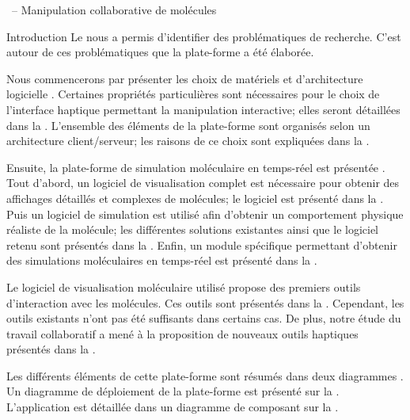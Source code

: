 \documentclass[myfrancais]{mythesis}
\begin{document}
	\begin{mychapter}{\myShaddock\ -- Manipulation collaborative de molécules}
		\begin{mysection}{Introduction}
			Le  nous a permis d'identifier des problématiques de recherche.
			C'est autour de ces problématiques que la plate-forme \myShaddock a été élaborée.

			Nous commencerons par présenter les choix de matériels et d'architecture logicielle .
			Certaines propriétés particulières sont nécessaires pour le choix de l'interface haptique permettant la manipulation interactive; elles seront détaillées dans la .
			L'ensemble des éléments de la plate-forme sont organisés selon un architecture client/serveur; les raisons de ce choix sont expliquées dans la .

			Ensuite, la plate-forme de simulation moléculaire en temps-réel est présentée .
			Tout d'abord, un logiciel de visualisation complet est nécessaire pour obtenir des affichages détaillés et complexes de molécules; le logiciel est présenté dans la .
			Puis un logiciel de simulation est utilisé afin d'obtenir un comportement physique réaliste de la molécule; les différentes solutions existantes ainsi que le logiciel retenu sont présentés dans la .
			Enfin, un module spécifique permettant d'obtenir des simulations moléculaires en temps-réel est présenté dans la .

			Le logiciel de visualisation moléculaire utilisé propose des premiers outils d'interaction avec les molécules.
			Ces outils sont présentés dans la .
			Cependant, les outils existants n'ont pas été suffisants dans certains cas.
			De plus, notre étude du travail collaboratif a mené à la proposition de nouveaux outils haptiques présentés dans la .

			Les différents éléments de cette plate-forme sont résumés dans deux diagrammes .
			Un diagramme de déploiement  de la plate-forme \myShaddock est présenté sur la .
			L'application  est détaillée dans un diagramme de composant  sur la .


\end{mysection}
\end{mychapter}
\end{document}
